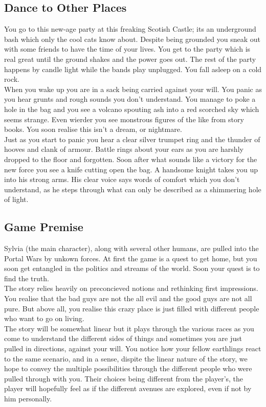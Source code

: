 \documentclass[a4paper]{article}
\begin{document}
\subsection{Dance to Other Places}

You go to this new-age party at this freaking Scotish Castle; its an underground bash which only the cool cats know about. Despite being grounded you sneak out with some friends to have the time of your lives. You get to the party which is real great until the ground shakes and the power goes out. The rest of the party happens by candle light while the bands play unplugged. You fall asleep on a cold rock.\\
When you wake up you are in a sack being carried against your will. You panic as you hear grunts and rough sounds you don't understand. You manage to poke a hole in the bag and you see a volcano spouting ash into a red scorched sky which seems strange. Even wierder you see monstrous figures of the like from story books. You soon realise this isn't a dream, or nightmare.\\
Just as you start to panic you hear a clear silver trumpet ring and the thunder of hooves and clank of armour. Battle rings about your ears as you are harshly dropped to the floor and forgotten. Soon after what sounds like a victory for the new force you see a knife cutting open the bag. A handsome knight takes you up into his strong arms. His clear voice says words of comfort which you don't understand, as he steps through what can only be described as a shimmering hole of light.

\subsection{Game Premise}

Sylvia (the main character), along with several other humans, are pulled into the Portal Wars by unkown forces. At first the game is a quest to get home, but you soon get entangled in the politics and streams of the world. Soon your quest is to find the truth.\\
The story relies heavily on preconcieved notions and rethinking first impressions. You realise that the bad guys are not the all evil and the good guys are not all pure. But above all, you realise this crazy place is just filled with different people who want to go on living.\\

The story will be somewhat linear but it plays through the various races as you come to understand the different sides of things and sometimes you are just pulled in directions, against your will. You notice how your fellow earthlings react to the same scenario, and in a sense, dispite the linear nature of the story, we hope to convey the multiple possibilities through the different people who were pulled through with you. Their choices being different from the player's, the player will hopefully feel as if the different avenues are explored, even if not by him personally.\\
\end{document}
